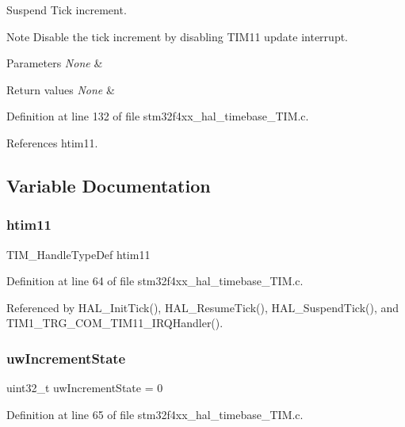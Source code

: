 Suspend Tick increment. 

\begin{DoxyNote}{Note}
Disable the tick increment by disabling T\+I\+M11 update interrupt. 
\end{DoxyNote}

\begin{DoxyParams}{Parameters}
{\em None} & \\
\hline
\end{DoxyParams}

\begin{DoxyRetVals}{Return values}
{\em None} & \\
\hline
\end{DoxyRetVals}


Definition at line 132 of file stm32f4xx\+\_\+hal\+\_\+timebase\+\_\+\+T\+I\+M.\+c.



References htim11.



\subsection{Variable Documentation}
\mbox{\label{group___h_a_l___time_base_ga2f22f985c4f33318fdcd4cc996623bf4}} 
\subsubsection{\texorpdfstring{htim11}{htim11}}
{\footnotesize\ttfamily T\+I\+M\+\_\+\+Handle\+Type\+Def htim11}



Definition at line 64 of file stm32f4xx\+\_\+hal\+\_\+timebase\+\_\+\+T\+I\+M.\+c.



Referenced by H\+A\+L\+\_\+\+Init\+Tick(), H\+A\+L\+\_\+\+Resume\+Tick(), H\+A\+L\+\_\+\+Suspend\+Tick(), and T\+I\+M1\+\_\+\+T\+R\+G\+\_\+\+C\+O\+M\+\_\+\+T\+I\+M11\+\_\+\+I\+R\+Q\+Handler().

\mbox{\label{group___h_a_l___time_base_gad252e5fa14fe03797c816cfb14962693}} 
\subsubsection{\texorpdfstring{uw\+Increment\+State}{uwIncrementState}}
{\footnotesize\ttfamily uint32\+\_\+t uw\+Increment\+State = 0}



Definition at line 65 of file stm32f4xx\+\_\+hal\+\_\+timebase\+\_\+\+T\+I\+M.\+c.

